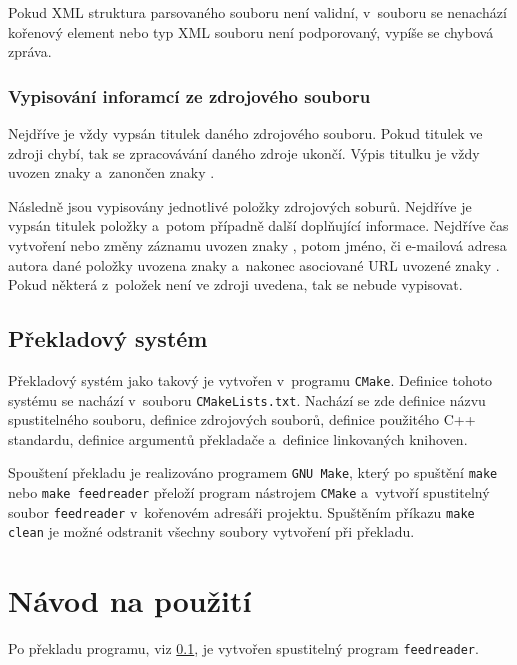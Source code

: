 \documentclass[a4paper, 11pt]{article}
\begin{document}
	Pokud XML struktura parsovaného souboru není validní, v~souboru se
	nenachází kořenový element nebo typ XML souboru není podporovaný,
	vypíše se chybová zpráva.

	\subsubsection{Vypisování inforamcí ze zdrojového souboru}

	Nejdříve je vždy vypsán titulek daného zdrojového souboru. Pokud titulek
	ve zdroji chybí, tak se zpracovávání daného zdroje ukončí. Výpis titulku
	je vždy uvozen znaky \uv{*** } a~zanončen znaky \uv{ ***}.

	Následně jsou vypisovány jednotlivé položky zdrojových soburů. Nejdříve je
	vypsán titulek položky a~potom případně další doplňující informace.
	Nejdříve čas vytvoření nebo změny záznamu uvozen znaky , potom
	jméno, či e-mailová adresa autora dané položky uvozena znaky 
	a~nakonec asociované URL uvozené znaky . Pokud některá
	z~položek není ve zdroji uvedena, tak se nebude vypisovat.


	\subsection{Překladový systém}
	\label{section:compilation}

	Překladový systém jako takový je vytvořen v~programu \texttt{CMake}.
	Definice tohoto systému se nachází v~souboru \texttt{CMakeLists.txt}.
	Nachází se zde definice názvu spustitelného souboru, definice zdrojových
	souborů, definice použitého C++ standardu, definice argumentů překladače
	a~definice linkovaných knihoven.

	Spouštení překladu je realizováno programem \texttt{GNU Make}, který po
	spuštění \texttt{make} nebo \texttt{make feedreader} přeloží program
	nástrojem \texttt{CMake} a~vytvoří spustitelný soubor \texttt{feedreader}
	v~kořenovém adresáři projektu. Spuštěním příkazu \texttt{make clean}
	je možné odstranit všechny soubory vytvoření při překladu.



	\section{Návod na použití}
	\label{section:usage}

	Po překladu programu, viz \ref{section:compilation}, je vytvořen
	spustitelný program \texttt{feedreader}.
\end{document}
